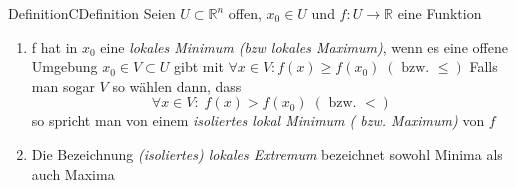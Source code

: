 \documentclass[11pt, a4paper]{memoir}
\begin{document}
\begin{ibox}[]{Definition}{CDefinition}
    Seien $ U \subset \mathbb{R}^n  $ offen, $ x_0 \in U $ und $ f: U \to \mathbb{R}  $ eine Funktion 
	\begin{enumerate}[label=\alph*)]
		\item f hat in $ x_0 $ eine \textit{lokales Minimum (bzw lokales Maximum)}, wenn es eine offene Umgebung $ x_0 \in V \subset U $ 
			gibt mit $ \forall x \in V : f \left(x\right) \geq  f \left(x_0\right) \; \left( \text{ bzw. } \leq  \right)  $ 
			Falls man sogar $ V $ so wählen dann, dass 
			$$ \forall x \in V : \; f \left(x\right)  > f \left(x_0\right) \; \left( \text{ bzw. } <  \right)  $$
			so spricht man von einem \textit{isoliertes lokal Minimum ( bzw. Maximum)} von $ f $ 
		\item Die Bezeichnung \textit{ (isoliertes) lokales Extremum } bezeichnet sowohl Minima als auch Maxima 
	\end{enumerate}
\end{ibox}
				
\end{document}
